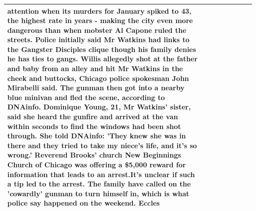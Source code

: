 \begin{table}[H]
\begin{tabular}{llrlllll}
attention when its murders for January spiked to 43, the highest rate in years - making the city even more dangerous than when mobster Al Capone ruled the streets. Police initially said Mr Watkins had links to the Gangster Disciples clique though his family denies he has ties to gangs. Willis allegedly shot at the father and baby from an alley and hit Mr Watkins in the cheek and buttocks, Chicago police spokesman John Mirabelli said. The gunman then got into a nearby blue minivan and fled the scene, according to DNAinfo. Dominique Young, 21, Mr Watkins' sister, said she heard the gunfire and arrived at the van within seconds to find the windows had been shot through. She told DNAinfo: 'They knew she was in there and they tried to take my niece's life, and it's so wrong.' Reverend Brooks' church New Beginnings Church of Chicago was offering a \$5,000 reward for information that leads to an arrest.It's unclear if such a tip led to the arrest. The family have called on the 'cowardly' gunman to turn himself in, which is what police say happened on the weekend. Eccles \\
\bottomrule
\end{tabular}
\end{table}
